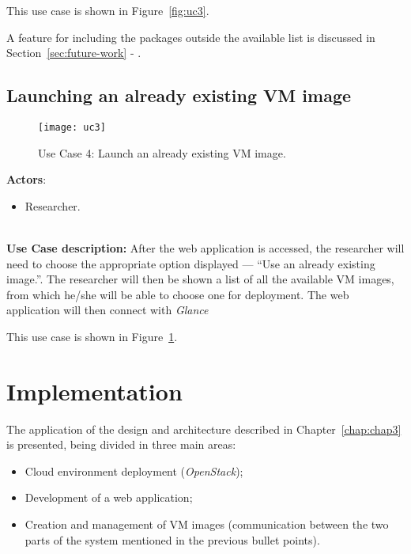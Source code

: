 This use case is shown in Figure~\ref{fig:uc3}.

A feature for including the packages outside the available list is discussed in Section~\ref{sec:future-work} - .


\subsection{Launching an already existing VM image}\label{subsec:uc4}
\begin{figure}[h!]
  \begin{center}
    \leavevmode 
    \texttt{[image: uc3]}
    \caption{Use Case 4: Launch an already existing VM image.}
    \label{fig:uc4}
  \end{center}
\end{figure}

\textbf{Actors}:

\begin{itemize}
\item Researcher.
\end{itemize}\ \\
\textbf{Use Case description:} After the web application is accessed, the researcher will need to choose the appropriate option displayed --- ``Use an already existing image.''. The researcher will then be shown a list of all the available VM images, from which he/she will be able to choose one for deployment. The web application will then connect with \textit{Glance}

This use case is shown in Figure~\ref{fig:uc4}.


\section{Implementation}\label{sec:implementation}


The application of the design and architecture described in Chapter~\ref{chap:chap3} is presented, being divided in three main areas:

\begin{itemize}
\item Cloud environment deployment (\textit{OpenStack});
\item Development of a web application;
\item Creation and management of VM images (communication between the two parts of the system mentioned in the previous bullet points).
\end{itemize}

